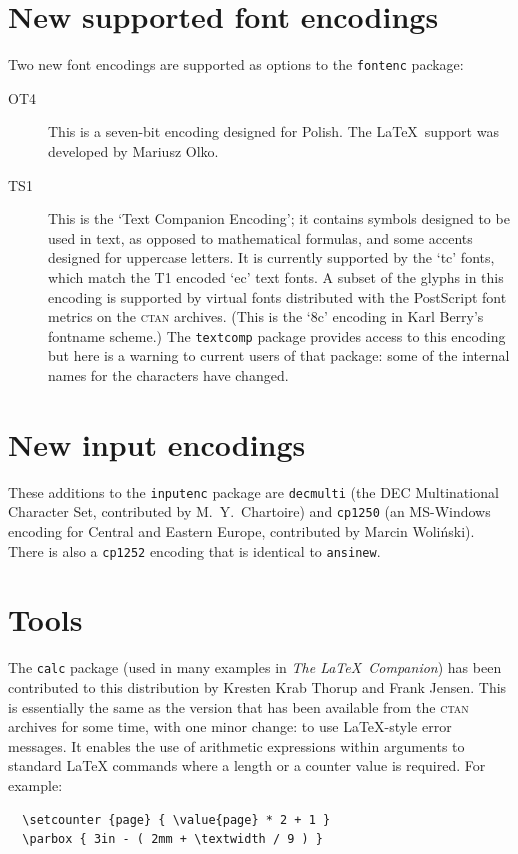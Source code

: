 \documentclass{ltnews}
\providecommand\pkg[1]{\texttt{#1}}
\providecommand\option[1]{\texttt{#1}}
\begin{document}
\maketitle

\section{New supported font encodings}

Two new font encodings are supported as options to the \pkg{fontenc}
package:
\begin{description}
\item [OT4]
This is a seven-bit encoding designed for Polish. The \LaTeX\ support
was developed by Mariusz Olko.
\item [TS1] This is the `Text Companion Encoding'; it contains symbols
designed to be used in text, as opposed to mathematical formulas, and
some accents designed for uppercase letters.  It is currently
supported by the `tc' fonts, which match the T1 encoded `ec' text
fonts.  A subset of the glyphs in this encoding is supported by
virtual fonts distributed with the PostScript font metrics on the
\textsc{ctan} archives. (This is the `8c' encoding in Karl Berry's
fontname scheme.)  The \pkg{textcomp} package provides access to
this encoding but here is a warning to current users of that package:
some of the internal names for the characters have changed.
\end{description}


\section{New input encodings}

These additions to the \pkg{inputenc} package are
\option{decmulti} (the DEC Multinational
Character Set,  contributed by M.~Y.~Chartoire)
and \option{cp1250} (an MS-Windows encoding for Central and Eastern
Europe, contributed by Marcin Woli\'nski).  There is also a
\option{cp1252} encoding that is identical to \option{ansinew}.


\section{Tools}

The \pkg{calc} package (used in many examples in \emph{The \LaTeX\
Companion}) has been contributed to this distribution by Kresten Krab
Thorup and Frank Jensen. This is essentially the same as the version
that has been available from the \textsc{ctan} archives for some time,
with one minor change: to use \LaTeX-style error messages.  It enables
the use of arithmetic expressions within arguments to standard
\LaTeX{} commands where a length or a counter value is required.  For
example:
\begin{verbatim}
  \setcounter {page} { \value{page} * 2 + 1 }
  \parbox { 3in - ( 2mm + \textwidth / 9 ) }
\end{verbatim}
\end{document}
